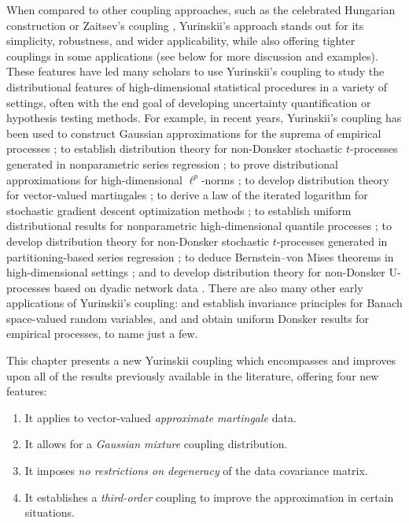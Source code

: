 \documentclass[11pt,lof]{puthesis}
\theoremstyle{break}
\theoremstyle{proof}
\begin{document}
When compared to other coupling approaches, such as the celebrated Hungarian
construction \citep{komlos1975approximation} or Zaitsev's coupling
\citep{zaitsev1987estimates,zaitsev1987gaussian}, Yurinskii's approach stands
out for its simplicity, robustness, and wider applicability, while also
offering tighter couplings in some applications (see below for more discussion
and examples). These features have led many scholars to use Yurinskii's
coupling to study the distributional features of high-dimensional statistical
procedures in a variety of settings, often with the end goal of developing
uncertainty quantification or hypothesis testing methods. For example, in
recent years, Yurinskii's coupling has been used to construct Gaussian
approximations for the suprema of empirical processes
\citep{chernozhukov2014gaussian}; to establish distribution theory for
non-Donsker stochastic $t$-processes generated in nonparametric series
regression \citep{belloni2015some}; to prove distributional approximations for
high-dimensional $\ell^p$-norms \citep{biau2015high}; to develop distribution
theory for vector-valued martingales \citep{belloni2018high,li2020uniform}; to
derive a law of the iterated logarithm for stochastic gradient descent
optimization methods \citep{anastasiou2019normal}; to establish uniform
distributional results for nonparametric high-dimensional quantile processes
\citep{belloni2019conditional}; to develop distribution theory for non-Donsker
stochastic $t$-processes generated in partitioning-based series regression
\citep{cattaneo2020large}; to deduce Bernstein--von Mises theorems in
high-dimensional settings \citep{ray2021bernstein}; and to develop distribution
theory for non-Donsker U-processes based on dyadic network data
\citep{cattaneo2024uniform}. There are also many other early applications of
Yurinskii's coupling: \citet{dudley1983invariance} and \citet{dehling1983limit}
establish invariance principles for Banach space-valued random variables, and
\citet{lecam1988} and \citet{sheehy1992uniform} obtain uniform Donsker results
for empirical processes, to name just a few.

This chapter presents a new Yurinskii coupling which encompasses and improves
upon all of the results previously available in the literature, offering four
new features:
%
\begin{enumerate}[label=(\roman*),leftmargin=*]
  \item
    \label{it:yurinskii_contribution_approximate_martingale}
    It applies to vector-valued \textit{approximate martingale} data.
  \item
    \label{it:yurinskii_contribution_gaussian_mixture}
    It allows for a \textit{Gaussian mixture} coupling distribution.
  \item
    \label{it:yurinskii_contribution_degeneracy}
    It imposes \textit{no restrictions on degeneracy} of the
    data covariance matrix.
  \item
    \label{it:yurinskii_contribution_third_order}
    It establishes a \textit{third-order} coupling to
    improve the approximation in certain situations.
\end{enumerate}
%
\end{document}
